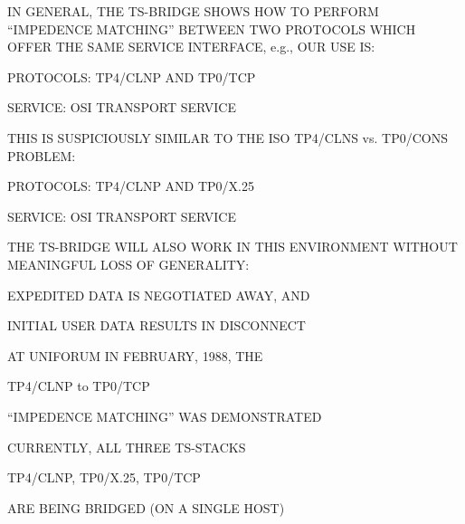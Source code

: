 \begin{bwslide}

\begin{nrtc}
\item	IN GENERAL, THE TS-BRIDGE SHOWS HOW TO PERFORM
	``IMPEDENCE MATCHING'' BETWEEN TWO PROTOCOLS WHICH OFFER THE
	SAME SERVICE INTERFACE, e.g., OUR USE IS:
    \begin{nrtc}
    \item	PROTOCOLS: TP4/CLNP AND TP0/TCP

    \item	SERVICE: OSI TRANSPORT SERVICE
    \end{nrtc}

\item	THIS IS SUSPICIOUSLY SIMILAR TO THE ISO TP4/CLNS vs. TP0/CONS PROBLEM:
    \begin{nrtc}
    \item	PROTOCOLS: TP4/CLNP AND TP0/X.25

    \item	SERVICE: OSI TRANSPORT SERVICE
    \end{nrtc}

\item	THE TS-BRIDGE WILL ALSO WORK IN THIS ENVIRONMENT WITHOUT
	MEANINGFUL LOSS OF GENERALITY:
    \begin{nrtc}
    \item	EXPEDITED DATA IS NEGOTIATED AWAY, AND

    \item	INITIAL USER DATA RESULTS IN DISCONNECT
    \end{nrtc}
\end{nrtc}
\end{bwslide}


\begin{bwslide}

\begin{nrtc}
\item	AT UNIFORUM IN FEBRUARY, 1988, THE
    \begin{nrtc}
    \item	TP4/CLNP to TP0/TCP
    \end{nrtc}
    ``IMPEDENCE MATCHING'' WAS DEMONSTRATED

\item	CURRENTLY, ALL THREE TS-STACKS
    \begin{nrtc}
    \item	TP4/CLNP, TP0/X.25, TP0/TCP
    \end{nrtc}
    ARE BEING BRIDGED (ON A SINGLE HOST)
\end{nrtc}
\end{bwslide}


